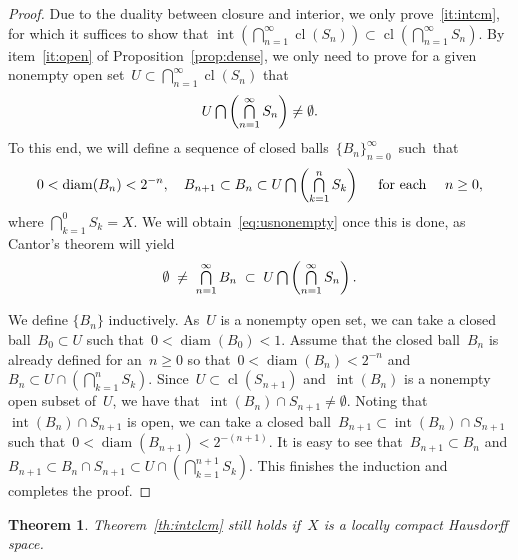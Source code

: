 \documentclass[11pt,a4paper]{article}  %
\newtheorem{theorem}{Theorem}[section]
\theoremstyle{definition}
\DeclareMathOperator*{\mcap}{\mathsmaller{\bigcap}}
\newcommand{\diam}{\operatorname{diam}}
\DeclareMathOperator{\inter}{int}
\DeclareMathOperator{\cl}{cl}
\numberwithin{equation}{section}
\begin{document}
\begin{proof}
    Due to the duality between closure and interior, we only prove~\ref{it:intcm}, for which it suffices to show that
  $\inter(\bigcap_{n=1}^\infty \cl(S_n))\subset \cl(\bigcap_{n=1}^\infty S_n)$.
  By item~\ref{it:open} of Proposition~\ref{prop:dense}, we only need to prove for a given
  nonempty open set~$U \subset \bigcap_{n=1}^\infty \cl(S_n)$ that%
  \begin{equation}
    \label{eq:usnonempty}
    U\mcap\left(\mcap_{n=1}^\infty S_n\right) \neq \emptyset.
  \end{equation}
  To this end, we will define a sequence of closed balls~$\{B_n\}_{n=0}^\infty$~such~that%
  \begin{equation}
    \label{eq:nest}
  0< \diam(B_n)< 2^{-n},
  \quad
  B_{n+1} \subset B_{n} \subset  U\mcap\left(\mcap_{k=1}^n S_k\right)
  \quad \text{ for each } \quad  n \ge 0,
  \end{equation}
  where $\bigcap_{k=1}^0 S_k=X$.
  We will obtain~\eqref{eq:usnonempty} once this is done, as
  Cantor's theorem will yield
    \begin{equation}
      \label{eq:nestnonempty}
      \emptyset \;\neq \;\mcap_{n=1}^\infty B_n \;\subset\; U\mcap \left(\mcap_{n=1}^\infty
      S_n\right).
    \end{equation}

    We define $\{B_n\}$ inductively.
    As~$U$ is a nonempty open set, we can take a closed ball~$B_0\subset U$
    such that~$0<\diam(B_0)< 1$.
    Assume that the closed ball~$B_n$ is already defined for an~$n\ge 0$
    so that~$0<\diam(B_n)< 2^{-n}$ and~$B_n\subset U\cap(\bigcap_{k=1}^n S_k)$.
    Since~$U\subset\cl(S_{n+1})$ and~$\inter(B_n)$ is a nonempty open subset of~$U$,
    we have that~$\inter(B_n) \cap S_{n+1} \neq \emptyset$. Noting that~$\inter(B_n)\cap S_{n+1}$ is open, we
    can take a closed ball~$B_{n+1}\subset \inter(B_n)\cap S_{n+1}$ such that~$0<\diam(B_{n+1})< 2^{-(n+1)}$.
    It is easy to see that~$B_{n+1}\subset B_n$ and
    $B_{n+1}\subset B_{n}\cap S_{n+1} \subset U\cap(\bigcap_{k=1}^{n+1} S_k)$.
     This finishes the induction and completes the proof.
\end{proof}

\begin{theorem}
  \label{th:intcllch} Theorem~\ref{th:intclcm} still holds if~$X$ is a locally compact Hausdorff
  space.
\end{theorem}
\end{document}
